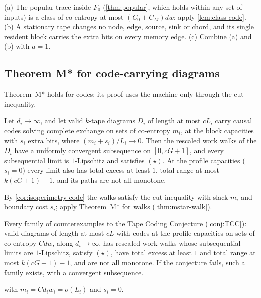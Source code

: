 \begin{outline}
(a) The popular trace inside $F_0$ (\cref{thm:popular}, which holds within any set of inputs) is a
class of co-entropy at most $(C_0+C_M)dw$; apply \cref{lem:class-code}. (b) A stationary tape changes
no node, edge, source, sink or chord, and its single resident block carries the extra bits on every
memory edge. (c) Combine (a) and (b) with $a=1$.
\end{outline}

\subsection{Theorem M* for code-carrying diagrams}

Theorem~M* holds for codes: its proof uses the machine only through the cut inequality.

\begin{theorem}\label{thm:mstar-diagram}
Let $d_i\to\infty$, and let valid $k$-tape diagrams $D_i$ of length at most $cL_i$ carry causal codes
solving complete exchange on sets of co-entropy $m_i$, at the block capacities with $s_i$ extra bits,
where $(m_i+s_i)/L_i\to0$. Then the rescaled work walks of the $D_i$ have a uniformly convergent
subsequence on $[0,cG+1]$, and every subsequential limit is $1$-Lipschitz and satisfies $(\star)$. At
the profile capacities ($s_i=0$) every limit also has total excess at least $1$, total range at most
$k(cG+1)-1$, and its paths are not all monotone.
\end{theorem}

\begin{outline}
By \cref{cor:isoperimetry-code} the walks satisfy the cut inequality with slack $m_i$ and boundary cost
$s_i$; apply Theorem~M* for walks (\cref{thm:mstar-walk}).
\end{outline}

\begin{corollary}\label{cor:cex-star}
Every family of counterexamples to the Tape Coding Conjecture (\cref{conj:TCC}): valid diagrams of
length at most $cL$ with codes at the profile capacities on sets of co-entropy $Cdw$, along
$d_i\to\infty$, has rescaled work walks whose subsequential limits are $1$-Lipschitz, satisfy $(\star)$,
have total excess at least $1$ and total range at most $k(cG+1)-1$, and are not all monotone. If the
conjecture fails, such a family exists, with a convergent subsequence.
\end{corollary}

\begin{outline}
 with $m_i=Cd_iw_i=o(L_i)$ and $s_i=0$.
\end{outline}
